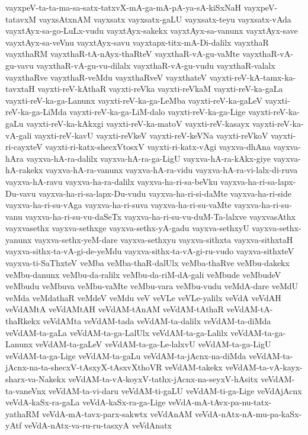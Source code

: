 {vayxpeV-ta-ta-ma-sa-satx-tatxvX-mA-ga-mA-pA-ya-sA-kiSxNaH
vayxpeV-tatavxM
vayxsAtxnAM
vayxsatx
vayxsatx-gaLU
vayxsatx-teyu
vayxsatx-vAda
vayxtAyx-sa-go-LuLx-vudu
vayxtAyx-sakekx
vayxtAyx-sa-vanunx
vayxtAyx-save
vayxtAyx-sa-veVnu
vayxtAyx-savu
vayxtapx-titx-mA-Di-dalilx
vayxthaR
vayxthaRM
vayxthaR-tA-nAyx-thaRteV
vayxthaR-vA-gu-vaMte
vayxthaR-vA-gu-vavu
vayxthaR-vA-gu-vu-dilalx
vayxthaR-vA-gu-vudu
vayxthaR-valalx
vayxthaRve
vayxthaR-veMdu
vayxthaRveV
vayxthateV
vayxti-reV-kA-tamx-ka-tavxtaH
vayxti-reV-kAthaR
vayxti-reVka
vayxti-reVkaM
vayxti-reV-ka-gaLa
vayxti-reV-ka-ga-Lanunx
vayxti-reV-ka-ga-LeMba
vayxti-reV-ka-gaLeV
vayxti-reV-ka-ga-LiMda
vayxti-reV-ka-ga-LiM-dalo
vayxti-reV-ka-ga-Lige
vayxti-reV-ka-gaLu
vayxti-reV-ka-kAkxgi
vayxti-reV-ka-matoV
vayxti-reV-kasayx
vayxti-reV-ka-vA-gali
vayxti-reV-kavU
vayxti-reVkeV
vayxti-reV-keVNa
vayxti-reVkoV
vayxti-ri-cayxteV
vayxti-ri-katx-shecxVtosxV
vayxti-ri-katx-vAgi
vayxva-dhAna
vayxva-hAra
vayxva-hA-ra-dalilx
vayxva-hA-ra-ga-LigU
vayxva-hA-ra-kAkx-giye
vayxva-hA-rakekx
vayxva-hA-ra-vanunx
vayxva-hA-ra-vidu
vayxva-hA-ra-vi-lalx-di-ruva
vayxva-hA-ravu
vayxva-ha-ra-dalilx
vayxva-ha-ri-sa-beVku
vayxva-ha-ri-sa-lapx-Du-vavu
vayxva-ha-ri-sa-lapx-Du-vudu
vayxva-ha-ri-si-daMte
vayxva-ha-ri-side
vayxva-ha-ri-su-vAga
vayxva-ha-ri-suva
vayxva-ha-ri-su-vaMte
vayxva-ha-ri-su-vanu
vayxva-ha-ri-su-vu-daSeTx
vayxva-ha-ri-su-vu-duM-Ta-lalxve
vayxvasAthx
vayxvasethx
vayxva-sethxge
vayxva-sethx-yA-gadu
vayxva-sethxyU
vayxva-sethx-yanunx
vayxva-sethx-yeM-dare
vayxva-sethxyu
vayxva-sithxta
vayxva-sithxtaH
vayxva-sithx-ta-vA-gi-de-yeMdu
vayxva-sithx-ta-vA-gi-ru-vudo
vayxva-sithxteV
vayxva-ti-SaThxteV
veMba
veMba-thaR-dalUlx
veMba-thaRve
veMbu-dakekx
veMbu-danunx
veMbu-da-ralilx
veMbu-da-riM-dA-gali
veMbude
veMbudeV
veMbudu
veMbuva
veMbu-vaMte
veMbu-vara
veMbu-vudu
veMdA-dare
veMdU
veMda
veMdathaR
veMdeV
veMdu
veV
veVLe
veVLe-yalilx
veVdA
veVdAH
veVdAMtA
veVdAMtAH
veVdAM-tAnAM
veVdAM-tAthaR
veVdAM-tA-thaRkekx
veVdAMta
veVdAM-tada
veVdAM-ta-dalilx
veVdAM-ta-diMda
veVdAM-ta-gaLa
veVdAM-ta-ga-LalUlx
veVdAM-ta-ga-Lalilx
veVdAM-ta-ga-Lanunx
veVdAM-ta-gaLeV
veVdAM-ta-ga-Le-lalxvU
veVdAM-ta-ga-LigU
veVdAM-ta-ga-Lige
veVdAM-ta-gaLu
veVdAM-ta-jAcnx-na-diMda
veVdAM-ta-jAcnx-na-ta-shecxV-tAsxyX-tAsxvXthoVR
veVdAM-takekx
veVdAM-ta-vA-kayx-sharx-va-Nakekx
veVdAM-ta-vA-koyxV-tathx-jAcnx-na-seyxV-hAsitx
veVdAM-ta-vaneVnx
veVdAM-ta-vi-daru
veVdAM-ti-gaLU
veVdAM-ti-ga-Lige
veVdAjAcnx
veVdA-kaSx-ra-gaLa
veVdA-kaSx-ra-ga-Lige
veVdA-mA-tAvx-pa-nu-tatx-yathaRM
veVdA-mA-tavx-parx-sakwtx
veVdAnAM
veVdA-nAtx-nA-mu-pa-kaSx-yAtf
veVdA-nAtx-va-ru-ru-tasxyA
veVdAnatx
}
